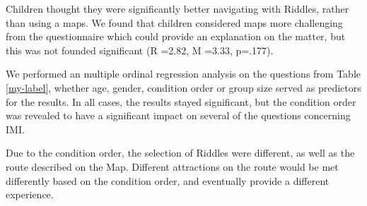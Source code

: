 Children thought they were significantly better navigating with Riddles, rather than using a maps. We found that children considered maps more challenging from the questionnaire which could provide an explanation on the matter, but this was not founded significant (R =2.82, M =3.33, p=.177).
 
We performed an multiple ordinal regression analysis on the questions from Table \ref{my-label}, whether age, gender, condition order or group size served as predictors for the results. In all cases, the results stayed significant, but the condition order was revealed to have a significant impact on several of the questions concerning IMI. 

Due to the condition order, the selection of Riddles were different, as well as the route described on the Map. Different attractions on the route would be met differently based on the condition order, and eventually provide a different experience. 


